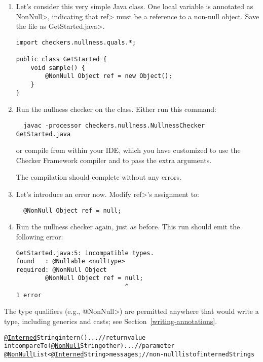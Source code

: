 \begin{enumerate}
\item
  Let's consider this very simple Java class.  One local variable is
  annotated as \<NonNull>, indicating that \<ref> must be a reference to a
  non-null object.  Save the file as \<GetStarted.java>.

\begin{Verbatim}
import checkers.nullness.quals.*;

public class GetStarted {
    void sample() {
        @NonNull Object ref = new Object();
    }
}
\end{Verbatim}

\item
  Run the nullness checker on the class.
  Either run this command:
\begin{Verbatim}
  javac -processor checkers.nullness.NullnessChecker GetStarted.java
\end{Verbatim}

\noindent
or compile from within your IDE, which you have customized to use the
Checker Framework compiler and to pass the extra arguments.

  The compilation should complete without any errors.

\item
  Let's introduce an error now.  Modify \<ref>'s assignment to:
\begin{Verbatim}
  @NonNull Object ref = null;
\end{Verbatim}

\item
  Run the nullness checker again, just as before.  This run should emit
  the following error:
\begin{Verbatim}
GetStarted.java:5: incompatible types.
found   : @Nullable <nulltype>
required: @NonNull Object
        @NonNull Object ref = null;
                              ^
1 error
\end{Verbatim}

\end{enumerate}

The type qualifiers (e.g., \<@NonNull>) are permitted anywhere
that would write a type, including generics and casts; see
Section~\ref{writing-annotations}.

\begin{alltt}
  \underline{@Interned} String intern() \ttlcb{} ... \ttrcb{}             // return value
  int compareTo(\underline{@NonNull} String other) \ttlcb{} ... \ttrcb{}  // parameter
  \underline{@NonNull} List<\underline{@Interned} String> messages;     // non-null list of interned Strings
\end{alltt}


